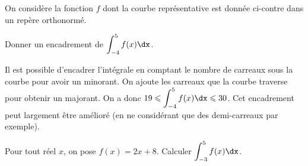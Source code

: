 \documentclass[11pt,fleqn, openany]{book} %
\begin{document}
\begin{exercise}

\begin{minipage}{0.55\linewidth}
On considère la fonction $f$ dont la courbe représentative est donnée ci-contre dans un repère orthonormé.


Donner un encadrement de $\displaystyle\int_{-4}^5f(x)\dx$.

\end{minipage}\hfill\begin{minipage}{0.4\linewidth}
\end{minipage}
\end{exercise}

\begin{solution}
Il est possible d'encadrer l'intégrale en comptant le nombre de carreaux sous la courbe pour avoir un minorant. On ajoute les carreaux que la courbe traverse pour obtenir un majorant. On a donc \(19 \leqslant \displaystyle\int_{-4}^5f(x)\dx \leqslant 30\). Cet encadrement peut largement être amélioré (en ne considérant que des demi-carreaux par exemple).
\end{solution}



\begin{exercise}Pour tout réel $x$, on pose $f(x)=2x+8$. Calculer $\displaystyle\int_{-3}^5 f(x)\dx$.\end{exercise}
\end{document}
